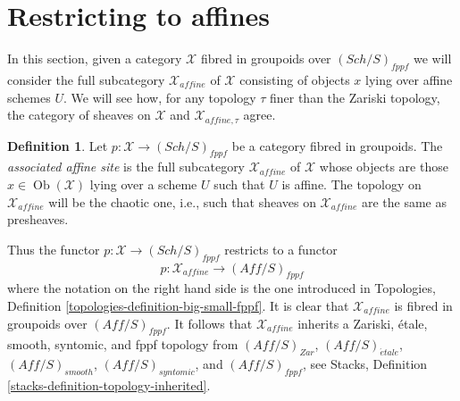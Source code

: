 \documentclass{stacks-project}
\theoremstyle{plain}
\theoremstyle{definition}
\newtheorem{definition}[subsection]{Definition}
\theoremstyle{remark}
\numberwithin{equation}{subsection}
\def\Sch{\mathit{Sch}}
\def\Ob{\mathop{\mathrm{Ob}}\nolimits}
\def\etale{{\acute{e}tale}}
\begin{document}
\section{Restricting to affines}
\label{section-alternative}

\noindent
In this section, given a category $\mathcal{X}$ fibred in groupoids over
$(\Sch/S)_{fppf}$ we will consider the full subcategory $\mathcal{X}_{affine}$
of $\mathcal{X}$ consisting of objects $x$ lying over affine schemes $U$.
We will see how, for any topology $\tau$ finer than the Zariski topology,
the category of sheaves on $\mathcal{X}$ and $\mathcal{X}_{affine, \tau}$
agree.

\begin{definition}
\label{definition-alternative}
Let $p : \mathcal{X} \to (\Sch/S)_{fppf}$ be a category fibred in groupoids.
The {\it associated affine site} is the full subcategory
$\mathcal{X}_{affine}$ of $\mathcal{X}$ whose objects are those
$x \in \Ob(\mathcal{X})$ lying over a scheme $U$ such that $U$
is affine. The topology on $\mathcal{X}_{affine}$ will be the chaotic one,
i.e., such that sheaves on $\mathcal{X}_{affine}$ are the same as presheaves.
\end{definition}

\noindent
Thus the functor $p : \mathcal{X} \to (\Sch/S)_{fppf}$ restricts to a functor
$$
p : \mathcal{X}_{affine} \longrightarrow (\textit{Aff}/S)_{fppf}
$$
where the notation on the right hand side is the one introduced in
Topologies, Definition \ref{topologies-definition-big-small-fppf}.
It is clear that $\mathcal{X}_{affine}$ is fibred in groupoids over
$(\textit{Aff}/S)_{fppf}$. It follows that $\mathcal{X}_{affine}$
inherits a Zariski, \'etale, smooth, syntomic, and fppf topology
from $(\textit{Aff}/S)_{Zar}$, $(\textit{Aff}/S)_\etale$,
$(\textit{Aff}/S)_{smooth}$, $(\textit{Aff}/S)_{syntomic}$, and
$(\textit{Aff}/S)_{fppf}$, see
Stacks, Definition \ref{stacks-definition-topology-inherited}.
\end{document}
